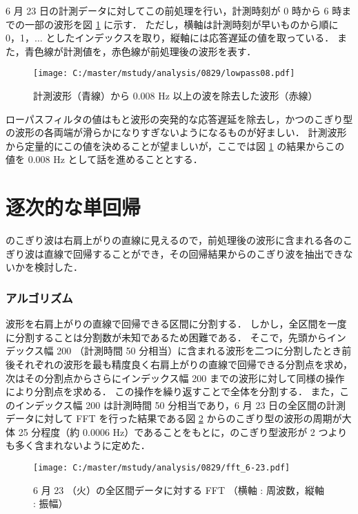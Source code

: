 \documentclass[a4j]{jarticle}
\begin{document}
6 月 23 日の計測データに対してこの前処理を行い，計測時刻が 0 時から 6 時までの一部の波形を図 \ref{lowpass} に示す．
ただし，横軸は計測時刻が早いものから順に 0，1，$\ldots$ としたインデックスを取り，縦軸には応答遅延の値を取っている．
また，青色線が計測値を，赤色線が前処理後の波形を表す．
\begin{figure}[tb]
\begin{center}
\texttt{[image: C:/master/mstudy/analysis/0829/lowpass08.pdf]}
\caption{計測波形（青線）から 0.008 Hz 以上の波を除去した波形（赤線）}
\label{lowpass}
\end{center}
\end{figure}
ローパスフィルタの値はもと波形の突発的な応答遅延を除去し，かつのこぎり型の波形の各両端が滑らかになりすぎないようになるものが好ましい．
計測波形から定量的にこの値を決めることが望ましいが，ここでは図 \ref{lowpass} の結果からこの値を 0.008 Hz として話を進めることとする．

\section{逐次的な単回帰}
のこぎり波は右肩上がりの直線に見えるので，前処理後の波形に含まれる各のこぎり波は直線で回帰することができ，その回帰結果からのこぎり波を抽出できないかを検討した．

\subsubsection{アルゴリズム}
波形を右肩上がりの直線で回帰できる区間に分割する．
しかし，全区間を一度に分割することは分割数が未知であるため困難である．
そこで，先頭からインデックス幅 200 （計測時間 50 分相当）に含まれる波形を二つに分割したとき前後それぞれの波形を最も精度良く右肩上がりの直線で回帰できる分割点を求め，次はその分割点からさらにインデックス幅 200 までの波形に対して同様の操作により分割点を求める．
この操作を繰り返すことで全体を分割する．
また，このインデックス幅 200 は計測時間 50 分相当であり，6 月 23 日の全区間の計測データに対して FFT を行った結果である図 \ref{fft} からのこぎり型の波形の周期が大体 25 分程度（約 0.0006 Hz）であることをもとに，のこぎり型波形が 2 つよりも多く含まれないように定めた．
\begin{figure}[tb]
\begin{center}
\texttt{[image: C:/master/mstudy/analysis/0829/fft\_6-23.pdf]}
\caption{6 月 23 （火）の全区間データに対する FFT （横軸 : 周波数，縦軸 : 振幅）}
\label{fft}
\end{center}
\end{figure}
\end{document}

